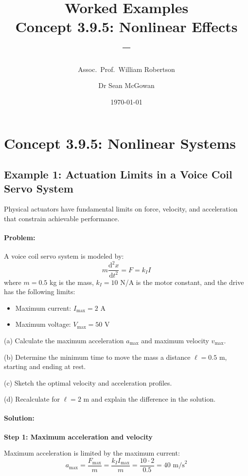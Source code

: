 \documentclass[11pt,a4paper]{article}
\title{\textbf{Worked Examples}\\[0.5em]
\large Concept 3.9.5: Nonlinear Effects\\[0.3em]
\normalsize \coursesubtitle{} -- \coursetitle}
\author{Assoc.\ Prof.\ William Robertson \and Dr Sean McGowan}
\date{\today}
\begin{document}
\maketitle
\tableofcontents
\newpage

\section{Concept 3.9.5: Nonlinear Systems}

\subsection{Example 1: Actuation Limits in a Voice Coil Servo System}

Physical actuators have fundamental limits on force, velocity, and acceleration that constrain achievable performance.

\paragraph{Problem:}
A voice coil servo system is modeled by:
\begin{equation}
	m\frac{\mathrm{d}^2x}{\mathrm{d}t^2} = F = k_I I
\end{equation}
where $m = 0.5$ kg is the mass, $k_I = 10$ N/A is the motor constant, and the drive has the following limits:
\begin{itemize}
\item Maximum current: $I_{\max} = 2$ A
\item Maximum voltage: $V_{\max} = 50$ V
\end{itemize}

(a) Calculate the maximum acceleration $a_{\max}$ and maximum velocity $v_{\max}$.

(b) Determine the minimum time to move the mass a distance $\ell = 0.5$ m, starting and ending at rest.

(c) Sketch the optimal velocity and acceleration profiles.

(d) Recalculate for $\ell = 2$ m and explain the difference in the solution.

\paragraph{Solution:}

\textbf{Step 1: Maximum acceleration and velocity}

Maximum acceleration is limited by the maximum current:
\begin{equation}
	a_{\max} = \frac{F_{\max}}{m} = \frac{k_I I_{\max}}{m} = \frac{10 \cdot 2}{0.5} = 40 \text{ m/s}^2
\end{equation}
\end{document}
